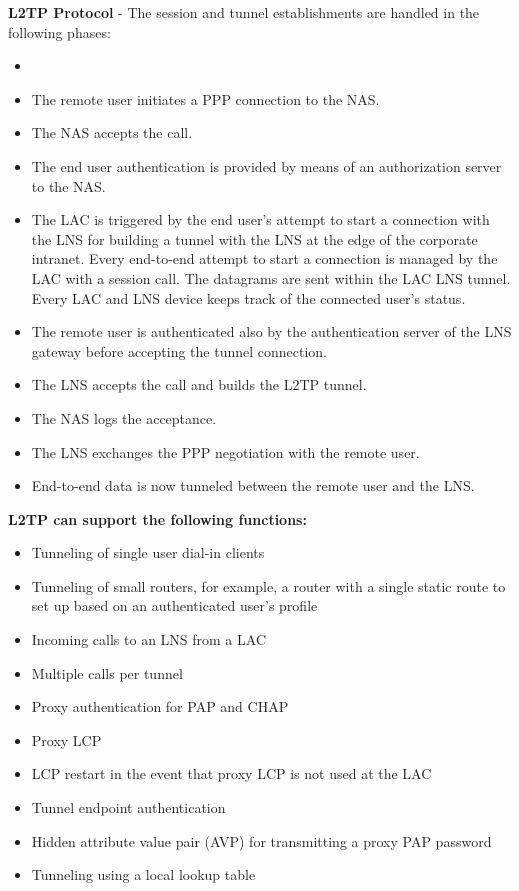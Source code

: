\documentclass[10pt,a4paper]{article}
\begin{document}
\begin{itemize}
\begin{itemize}
\textbf{L2TP Protocol} - The session and tunnel establishments are handled in the following phases:
\begin{itemize}
\item 
\item The remote user initiates a PPP connection to the NAS.
\item The NAS accepts the call.
\item The end user authentication is provided by means of an authorization server
to the NAS.
\item The LAC is triggered by the end user’s attempt to start a connection with the
LNS for building a tunnel with the LNS at the edge of the corporate intranet.
Every end-to-end attempt to start a connection is managed by the LAC with a
session call. The datagrams are sent within the LAC LNS tunnel. Every LAC
and LNS device keeps track of the connected user’s status.
\item The remote user is authenticated also by the authentication server of the LNS gateway before accepting the tunnel connection.
\item The LNS accepts the call and builds the L2TP tunnel.
\item The NAS logs the acceptance.
\item The LNS exchanges the PPP negotiation with the remote user.
\item End-to-end data is now tunneled between the remote user and the LNS.
\end{itemize}



\textbf{L2TP can support the following functions:}

\begin{itemize}
\item Tunneling of single user dial-in clients
\item Tunneling of small routers, for example, a router with a single static route to
set up based on an authenticated user's profile
\item Incoming calls to an LNS from a LAC
\item Multiple calls per tunnel
\item Proxy authentication for PAP and CHAP
\item Proxy LCP
\item LCP restart in the event that proxy LCP is not used at the LAC
\item Tunnel endpoint authentication
\item Hidden attribute value pair (AVP) for transmitting a proxy PAP password
\item Tunneling using a local lookup table
\end{itemize}


\end{itemize}
\end{itemize}
\end{document}
